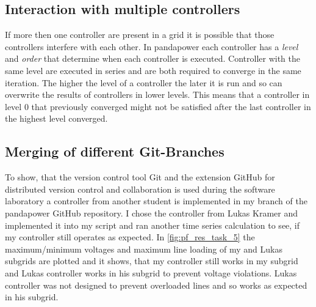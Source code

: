 \documentclass[conference]{IEEEtran}
\begin{document}
\subsection{Interaction with multiple controllers}
If more then one controller are present in a grid it is possible that those controllers interfere with each other. In pandapower each controller has a \textit{level} and \textit{order} that determine when each controller is executed. Controller with the same level are executed in series and are both required to converge in the same iteration. The higher the level of a controller the later it is run and so can overwrite the results of controllers in lower levels. This means that a controller in level 0 that previously converged might not be satisfied after the last controller in the highest level converged.
\subsection*{Merging of different Git-Branches}
To show, that the version control tool Git and the extension GitHub for distributed version control and collaboration is used during the software laboratory a controller from another student is implemented in my branch of the pandapower GitHub repository. I chose the controller from Lukas Kramer and implemented it into my script and ran another time series calculation to see, if my controller still operates as expected. In \cref{fig:pf_res_task_5} the maximum/minimum voltages and maximum line loading of my and Lukas subgrids are plotted and it shows, that my controller still works in my subgrid and Lukas controller works in his subgrid to prevent voltage violations. Lukas controller was not designed to prevent overloaded lines and so works as expected in his subgrid. 
 

\end{document}
